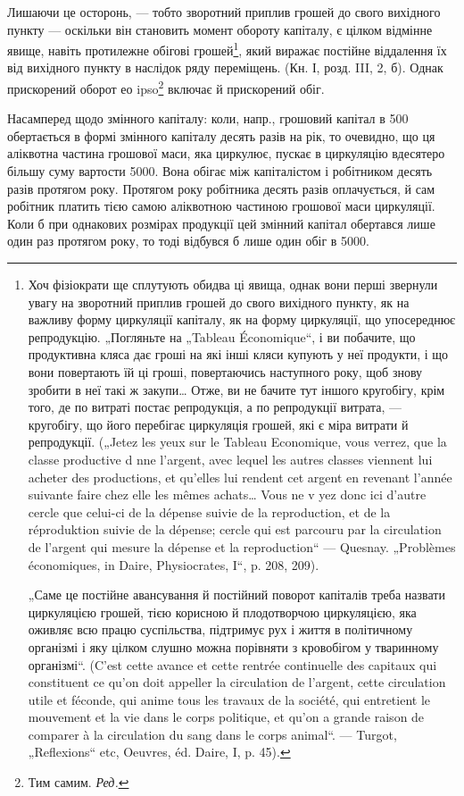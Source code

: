 Лишаючи це осторонь,  — тобто зворотний приплив
грошей до свого вихідного пункту — оскільки він становить момент
обороту капіталу, є цілком відмінне явище, навіть протилежне обігові
грошей\footnote{
Хоч фізіократи ще сплутують обидва ці явища, однак вони перші звернули
увагу на зворотний приплив грошей до свого вихідного пункту, як на важливу
форму циркуляції капіталу, як на форму циркуляції, що упосереднює репродукцію.
„Погляньте на „Tableau Économique“, і ви побачите, що продуктивна кляса дає
гроші на які інші кляси купують у неї продукти, і що вони повертають їй ці
гроші, повертаючись наступного року, щоб знову зробити в неї такі ж закупи\dots{}
Отже, ви не бачите тут іншого кругобігу, крім того, де по витраті
постає репродукція, а по репродукції витрата, — кругобігу, що його перебігає
циркуляція грошей, які є міра витрати й репродукції. („Jetez les yeux sur le
Tableau Economique, vous verrez, que la classe productive d nne l’argent,
avec lequel les autres classes viennent lui acheter des productions, et qu’elles lui
rendent cet argent en revenant l’année suivante faire chez elle les mêmes achats\dots{}
Vous ne v yez donc ici d’autre cercle que celui-ci de la dépense suivie de la reproduction,
et de la réproduktion suivie de la dépense; cercle qui est parcouru par la
circulation de l’argent qui mesure la dépense et la reproduction“ — Quesnay. „Problèmes
économiques, in Daire, Physiocrates, I“, p. 208, 209).

„Саме це постійне авансування й постійний поворот капіталів треба назвати
циркуляцією грошей, тією корисною й плодотворчою циркуляцією, яка оживляє
всю працю суспільства, підтримує рух і життя в політичному організмі і яку
цілком слушно можна порівняти з кровобігом у тваринному організмі“. (C’est
cette avance et cette rentrée continuelle des capitaux qui constituent ce qu’on doit
appeller la circulation de l’argent, cette circulation utile et féconde, qui anime tous
les travaux de la société, qui entretient le mouvement et la vie dans le corps politique,
et qu’on a grande raison de comparer à la circulation du sang dans le corps animal“.
— Turgot, „Reflexions“ etc, Oeuvres, éd. Daire, I, p. 45).}, який виражає постійне віддалення їх від вихідного
пункту в наслідок ряду переміщень. (Кн. І, розд. III, 2, б). Однак прискорений
оборот ео ipso\footnote*{
Тим самим. \emph{Ред.}
} включає й прискорений обіг.

Насамперед щодо змінного капіталу: коли, напр., грошовий капітал
в 500 обертається в формі змінного капіталу десять разів на
рік, то очевидно, що ця аліквотна частина грошової маси, яка циркулює,
пускає в циркуляцію вдесятеро більшу суму вартости \deq{} 5000.
Вона обігає між капіталістом і робітником десять разів протягом року.
Протягом року робітника десять разів оплачується, й сам робітник платить
тією самою аліквотною частиною грошової маси циркуляції. Коли
б при однакових розмірах продукції цей змінний капітал обертався
лише один раз протягом року, то тоді відбувся б лише один обіг
в 5000.

